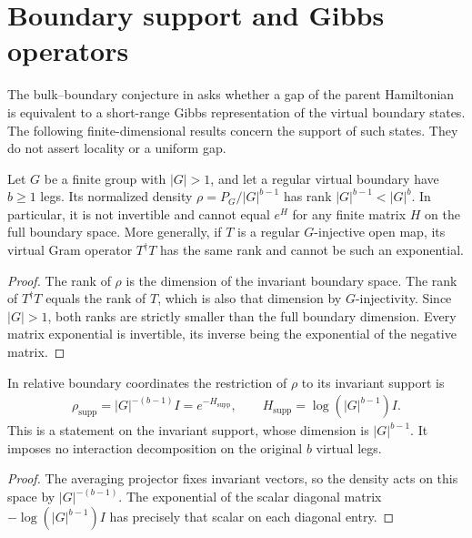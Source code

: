 \section{Boundary support and Gibbs operators}%
\label{sec:peps_regular_boundary_gibbs_support}

The bulk--boundary conjecture in \cite{Cirac2019OpenProblems} asks
whether a gap of the parent Hamiltonian is equivalent to a short-range
Gibbs representation of the virtual boundary states. The following
finite-dimensional results concern the support of such states. They
do not assert locality or a uniform gap.

\begin{lemma}%
    \label{thm:peps_regular_boundary_gibbs_obstruction}
    \leanok
    Let $G$ be a finite group with $|G|>1$, and let a regular
    virtual boundary have $b\geq1$ legs. Its normalized density
    $\rho=P_G/|G|^{b-1}$ has rank $|G|^{b-1}<|G|^b$.
    In particular, it is not invertible and cannot equal $e^H$
    for any finite matrix $H$ on the full boundary space.
    More generally, if $T$ is a regular $G$-injective open map,
    its virtual Gram operator $T^\dagger T$ has the same rank
    and cannot be such an exponential.
\end{lemma}

\begin{proof}\leanok
    The rank of $\rho$ is the dimension of the invariant boundary
    space. The rank of $T^\dagger T$ equals the rank of $T$,
    which is also that dimension by $G$-injectivity. Since
    $|G|>1$, both ranks are strictly smaller than the full
    boundary dimension. Every matrix exponential is invertible,
    its inverse being the exponential of the negative matrix.
\end{proof}

\begin{lemma}%
    \label{thm:peps_regular_boundary_supported_gibbs}
    \leanok
    In relative boundary coordinates the restriction of $\rho$
    to its invariant support is
    \begin{align}
        \rho_{\mathrm{supp}}=|G|^{-(b-1)}I=e^{-H_{\mathrm{supp}}},
        \qquad H_{\mathrm{supp}}=\log(|G|^{b-1})I.
    \end{align}
    This is a statement on the invariant support, whose dimension
    is $|G|^{b-1}$. It imposes no interaction decomposition on the
    original $b$ virtual legs.
\end{lemma}

\begin{proof}\leanok
    The averaging projector fixes invariant vectors, so the
    density acts on this space by $|G|^{-(b-1)}$. The exponential
    of the scalar diagonal matrix $-\log(|G|^{b-1})I$ has precisely
    that scalar on each diagonal entry.
\end{proof}
